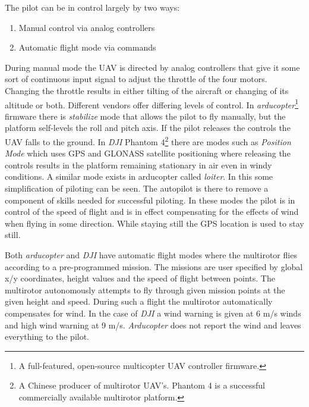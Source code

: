 \documentclass[12pt,oneside]{reedthesis}
\providecommand{\tightlist}{%
  \setlength{\itemsep}{0pt}\setlength{\parskip}{0pt}}
\theoremstyle{definition}
\theoremstyle{definition}
\theoremstyle{definition}
\theoremstyle{remark}
\begin{document}
The pilot can be in control largely by two ways:
\begin{enumerate}
\def\labelenumi{\arabic{enumi}.}
\tightlist
\item
  Manual control via analog controllers
\item
  Automatic flight mode via commands
\end{enumerate}
During manual mode the UAV is directed by analog controllers that give
it some sort of continuous input signal to adjust the throttle of the
four motors. Changing the throttle results in either tilting of the
aircraft or changing of its altitude or both. Different vendors offer
differing levels of control. In \emph{arducopter}\footnote{A
  full-featured, open-source multicopter UAV controller firmware.}
firmware there is \emph{stabilize} mode that allows the pilot to fly
manually, but the platform self-levels the roll and pitch axis. If the
pilot releases the controls the UAV falls to the ground. In \emph{DJI}
Phantom 4\footnote{A Chinese producer of multirotor UAV's. Phantom 4 is
  a successful commercially available multirotor platform.} there are
modes such as \emph{Position Mode} which uses GPS and GLONASS satellite
positioning where releasing the controls results in the platform
remaining stationary in air even in windy conditions. A similar mode
exists in arducopter called \emph{loiter}. In this some simplification
of piloting can be seen. The autopilot is there to remove a component of
skills needed for successful piloting. In these modes the pilot is in
control of the speed of flight and is in effect compensating for the
effects of wind when flying in some direction. While staying still the
GPS location is used to stay still.

Both \emph{arducopter} and \emph{DJI} have automatic flight modes where
the multirotor flies according to a pre-programmed mission. The missions
are user specified by global x/y coordinates, height values and the
speed of flight between points. The multirotor autonomously attempts to
fly through given mission points at the given height and speed. During
such a flight the multirotor automatically compensates for wind. In the
case of \emph{DJI} a wind warning is given at 6 m/s winds and high wind
warning at 9 m/s. \emph{Arducopter} does not report the wind and leaves
everything to the pilot.
\end{document}
